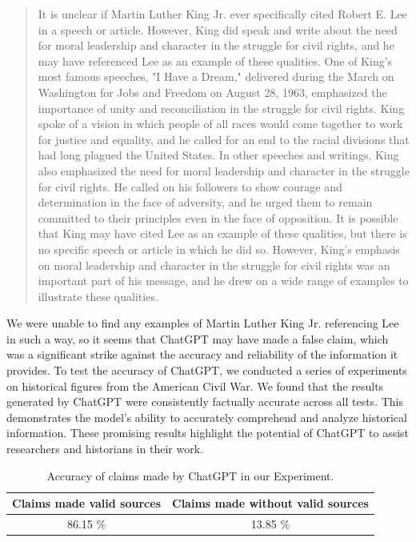 \documentclass[letterpaper, 10pt, conference]{ieeeconf}
\begin{document}
    \begin{quote}
        
    It is unclear if Martin Luther King Jr. ever specifically cited Robert E. Lee in a speech or article. However, King did
    speak and write about the need for moral leadership and character in the struggle for civil rights, and he may have
    referenced Lee as an example of these qualities. One of King's most famous speeches, "I Have a Dream," delivered during
    the March on Washington for Jobs and Freedom on August 28, 1963, emphasized the importance of unity and
    reconciliation in the struggle for civil rights. King spoke of a vision in which people of all races would come together to
    work for justice and equality, and he called for an end to the racial divisions that had long plagued the United States. In
    other speeches and writings, King also emphasized the need for moral leadership and character in the struggle for civil
    rights. He called on his followers to show courage and determination in the face of adversity, and he urged them to
    remain committed to their principles even in the face of opposition. It is possible that King may have cited Lee as an
    example of these qualities, but there is no specific speech or article in which he did so. However, King's emphasis on
    moral leadership and character in the struggle for civil rights was an important part of his message, and he drew on a
    wide range of examples to illustrate these qualities\cite{navarburnett2023}.
    \end{quote}

    We were unable to find any examples of Martin Luther King Jr. referencing Lee in such a way, so it seems that ChatGPT may have
    made a false claim, which was a significant strike against the accuracy and reliability of the information it provides.
    To test the accuracy of ChatGPT, we conducted a series of experiments on historical figures from the American Civil War. We
    found that the results generated by ChatGPT were consistently factually accurate across all tests. This demonstrates the model's
    ability to accurately comprehend and analyze historical information. These promising results highlight the potential of ChatGPT to
    assist researchers and historians in their work.

    \begin{table}
        \centering
        \caption{Accuracy of claims made by ChatGPT in our Experiment.}
        \label{tab:table2}
        \begin{tabular}{c|c}
            Claims made valid sources & Claims made without valid sources\\
            \hline
            86.15 \% & 13.85 \% \\
            \hline
    
        \end{tabular}

    \end{table}
\end{document}
